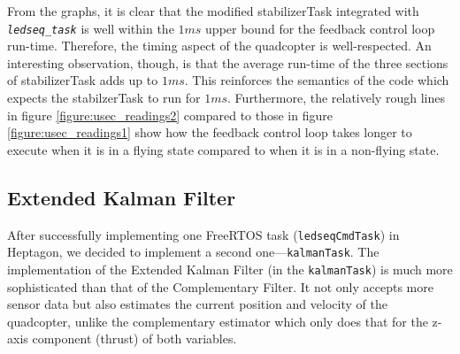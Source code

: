 \documentclass[10pt, a4paper]{article}
\newcommand{\textFunc}[1]{\texttt{\textit{#1}}}
\newcommand{\code}[1]{\texttt{#1}}
\begin{document}
    From the graphs, it is clear that the modified stabilizerTask integrated with \textFunc{ledseq\_task} is well within the $1ms$ upper bound for the feedback control loop run-time. Therefore, the timing aspect of the quadcopter is well-respected. An interesting observation, though, is that the average run-time of the three sections of stabilizerTask adds up to $1ms$. This reinforces the semantics of the code which expects the stabilzerTask to run for $1ms$. Furthermore, the relatively rough lines in figure \ref{figure:usec_readings2} compared to those in figure \ref{figure:usec_readings1} show how the feedback control loop takes longer to execute when it is in a flying state compared to when it is in a non-flying state.

    \subsection{Extended Kalman Filter}
    After successfully implementing one FreeRTOS task (\code{ledseqCmdTask}) in Heptagon, we decided to implement a second one---\code{kalmanTask}. The implementation of the Extended Kalman Filter (in the \code{kalmanTask}) is much more sophisticated than that of the Complementary Filter. It not only accepts more sensor data but also estimates the current position and velocity of the quadcopter, unlike the complementary estimator which only does that for the z-axis component (thrust) of both variables.
\end{document}
